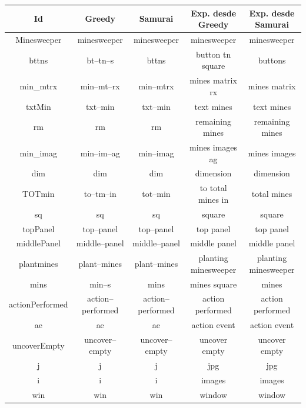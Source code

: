 \begin{table}

		\centering
   		\begin{tabular}{| c | c | c | c | c |}     
   		
       \hline
  	   \textbf{Id} & \textbf{Greedy} & \textbf{Samurai} & \textbf{Exp. desde Greedy} & \textbf{Exp. desde Samurai} \\ \hline
Minesweeper&minesweeper&minesweeper&minesweeper&minesweeper\\ \hline
bttns&bt--tn--s&bttns&button tn square&buttons\\ \hline
min\_mtrx&min--mt--rx&min--mtrx&mines matrix rx&mines matrix\\ \hline
txtMin&txt--min&txt--min&text mines&text mines\\ \hline
rm&rm&rm&remaining mines&remaining mines\\ \hline
min\_imag&min--im--ag&min--imag&mines images ag&mines images\\ \hline
dim&dim&dim&dimension&dimension\\ \hline
TOTmin&to--tm--in&tot--min&to total mines in&total mines\\ \hline
sq&sq&sq&square&square\\ \hline
topPanel&top--panel&top--panel&top panel&top panel\\ \hline
middlePanel&middle--panel&middle--panel&middle panel&middle panel\\ \hline
plantmines&plant--mines&plant--mines&planting minesweeper&planting minesweeper\\ \hline
mins&min--s&mins&mines square&mines\\ \hline
actionPerformed&action--performed&action--performed&action performed&action performed\\ \hline
ae&ae&ae&action event&action event\\ \hline
uncoverEmpty&uncover--empty&uncover--empty&uncover empty&uncover empty\\ \hline
j&j&j&jpg&jpg\\ \hline
i&i&i&images&images\\ \hline
win&win&win&window&window\\ \hline

\end{tabular}
\end{table}
